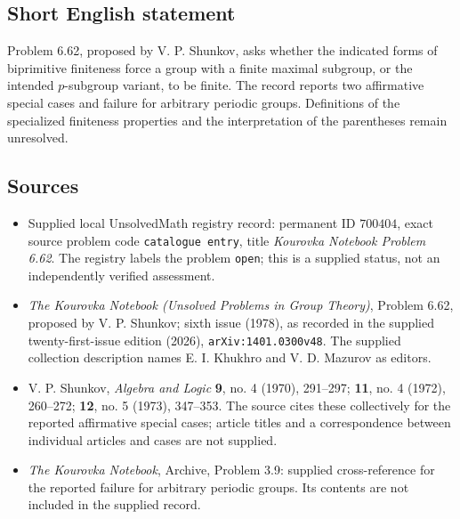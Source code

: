 \documentclass[11pt]{article}
\begin{document}
\subsection{Short English statement}
Problem 6.62, proposed by V. P. Shunkov, asks whether the indicated forms of biprimitive finiteness force a group with a finite maximal subgroup, or the intended \(p\)-subgroup variant, to be finite. The record reports two affirmative special cases and failure for arbitrary periodic groups. Definitions of the specialized finiteness properties and the interpretation of the parentheses remain unresolved.
\subsection{Sources}
\begin{itemize}
\item Supplied local UnsolvedMath registry record: permanent ID \(700404\), exact source problem code \texttt{catalogue entry}, title \emph{Kourovka Notebook Problem 6.62}. The registry labels the problem \texttt{open}; this is a supplied status, not an independently verified assessment.
\item \emph{The Kourovka Notebook (Unsolved Problems in Group Theory)}, Problem 6.62, proposed by V. P. Shunkov; sixth issue (1978), as recorded in the supplied twenty-first-issue edition (2026), \texttt{arXiv:1401.0300v48}. The supplied collection description names E. I. Khukhro and V. D. Mazurov as editors.
\item V. P. Shunkov, \emph{Algebra and Logic} \textbf{9}, no. 4 (1970), 291--297; \textbf{11}, no. 4 (1972), 260--272; \textbf{12}, no. 5 (1973), 347--353. The source cites these collectively for the reported affirmative special cases; article titles and a correspondence between individual articles and cases are not supplied.
\item \emph{The Kourovka Notebook}, Archive, Problem 3.9: supplied cross-reference for the reported failure for arbitrary periodic groups. Its contents are not included in the supplied record.
\end{itemize}
\end{document}

